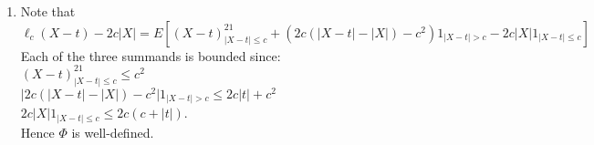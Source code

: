 \documentclass[a4paper,11pt]{article}
\begin{document}
\begin{enumerate}
  \item Note that $$\ell_c(X-t)-2c|X| = E\left[(X-t)^21_{|X-t|\leq c} + \left(2c(|X-t|-|X|)-c^2 \right)1_{|X-t|>c} - 2c|X|1_{|X-t|\leq c}\right]$$
  Each of the three summands is bounded since: \\$(X-t)^21_{|X-t|\leq c} \leq c^2$\\
  $\big|2c(|X-t|-|X|)-c^2 \big|1_{|X-t|>c}\leq 2c|t|+c^2$\\
  $2c|X|1_{|X-t|\leq c}\leq 2c(c+|t|)$.\\
  Hence $\Phi$ is well-defined.
\end{enumerate}
\end{document}
